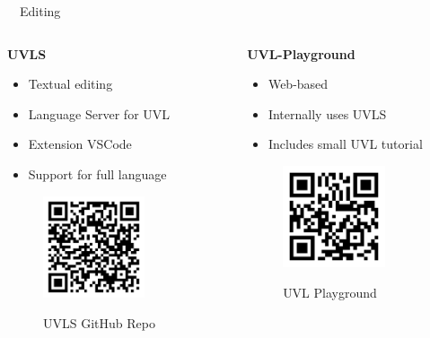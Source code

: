 \documentclass[
	aspectratio=169, %
	8pt, %
	nosectionframes, %
]{beamer}
\newcommand{\inlinesubtitle}[1]{\textcolor{gray!60}{~{}~#1}}
\begin{document}
\begin{frame}{\insertsection \inlinesubtitle{Editing}}
    	\begin{columns}[t]
		\begin{column}{0.3\textwidth}
            \textbf{UVLS}
			\begin{itemize}
                    \item Textual editing
                    \item Language Server for UVL
                    \item Extension VSCode
                    \item Support for full language
			\end{itemize}
            \begin{figure}
                \centering
                \includegraphics[width=3cm]{pics/qr/uvls.pdf}
                
                UVLS GitHub Repo
            \end{figure}

		\end{column}
  		\begin{column}{0.3\textwidth}
            \textbf{UVL-Playground}
			\begin{itemize}
                    \item Web-based
                    \item Internally uses UVLS
                    \item Includes small UVL tutorial
			\end{itemize}
   			            \begin{figure}
                \centering
                \includegraphics[width=3cm]{pics/qr/uvlplayground.pdf}
                
                UVL Playground
            \end{figure}


\end{column}
\end{columns}
\end{frame}
\end{document}
